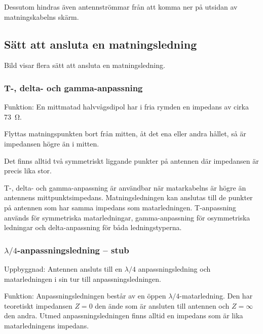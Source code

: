Dessutom hindras även antennströmmar från att komma ner på utsidan av
matningskabelns skärm.



\newpage
\subsection{Sätt att ansluta en matningsledning}

Bild  visar flera sätt att ansluta en matningsledning.

\subsubsection{T-, delta- och gamma-anpassning}

Funktion:
En mittmatad halvvågsdipol har i fria rymden en impedans av cirka \qty{73}{\ohm}.

Flyttas matningspunkten bort från mitten, åt det ena eller andra hållet, så är
impedansen högre än i mitten.

Det finns alltid två symmetriskt liggande punkter på antennen där
impedansen är precis lika stor.

T-, delta- och gamma-anpassning är användbar när matarkabelns är högre
än antennens mittpunktsimpedans.
Matningsledningen kan anslutas till de punkter på antennen som har samma
impedans som matarledningen.
T-anpassning används för symmetriska matarledningar, gamma-anpassning för
osymmetriska ledningar och delta-anpassning för båda ledningstyperna.

\subsubsection{\(\lambda/4\)-anpassningsledning -- stub}

Uppbyggnad: Antennen ansluts till en \(\lambda/4\) anpassningsledning
och matarledningen i sin tur till anpassningsledningen.

Funktion: Anpassningsledningen består av en öppen \(\lambda/4\)-matarledning.
Den har teoretiskt impedansen \(Z = 0\) den ände som är ansluten till antennen
och \(Z = \infty\) den andra.
Utmed anpassningsledningen finns alltid en impedans som är lika matarledningens
impedans.

